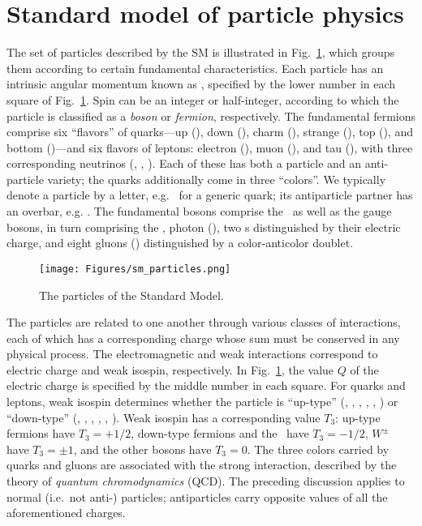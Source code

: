 \section{Standard model of particle physics} \label{sec:introduction_standard_model}
The set of particles described by the SM is illustrated in Fig.~\ref{fig:sm_particles}, which
groups them according to certain fundamental characteristics.
Each particle has an intrinsic angular momentum known as , specified by the lower number in each square of Fig.~\ref{fig:sm_particles}.
Spin can be an integer or half-integer, according to which the particle is classified as a \textit{boson} or \textit{fermion}, respectively.
The fundamental fermions comprise six ``flavors'' of quarks---up (\Pu), down (\Pd), charm (\Pc), strange (\Ps), top (\Pt), and bottom (\Pb)---and six flavors of
leptons: electron (\Pe), muon (\Pmu), and tau (\Ptau), with three corresponding neutrinos (\Pne, \Pnmu, \Pntau).
Each of these has both a particle and an anti-particle variety; the quarks additionally come in three ``colors''.
We typically denote a particle by a letter, e.g. \Pq\ for a generic quark; its antiparticle partner has an overbar, e.g. \Paq.
The fundamental bosons comprise the \PH\ as well as the gauge bosons, in turn comprising the \PZ, photon (\Pgamma),
two \PW s distinguished by their electric charge, and eight gluons (\Pg) distinguished by a color-anticolor doublet.

\begin{figure}[hbtp]
  \begin{center}
    \texttt{[image: Figures/sm\_particles.png]}
    \caption{
      The particles of the Standard Model.
    }
    \label{fig:sm_particles}
  \end{center}
\end{figure}

The particles are related to one another through various
classes of interactions, each of which has a corresponding charge whose sum must be conserved in any physical process.
The electromagnetic and weak interactions correspond to electric charge and weak isospin, respectively.
In Fig.~\ref{fig:sm_particles}, the value $Q$ of the electric charge is specified by the middle number in each square.
For quarks and leptons, weak isospin determines whether the particle is ``up-type''
(\Pu, \Pd, \Pt, \Pne, \Pnmu, \Pntau) or ``down-type'' (\Pd, \Ps, \Pb, \Pe, \Pmu, \Ptau).
Weak isospin has a corresponding value $T_{3}$: up-type fermions have $T_{3} = \mathrm{+}1/2$, down-type fermions and the \PH\ have
$T_{3} = \mathrm{-}1/2$, $W^\pm$ have $T_{3} = \pm1$, and the other bosons have $T_{3} = 0$.
The three colors carried by quarks and gluons are associated with the strong interaction, described by the theory of \textit{quantum
chromodynamics} (QCD). The preceding discussion applies to normal (i.e.\ not anti-) particles; antiparticles carry opposite values of all the
aforementioned charges.

